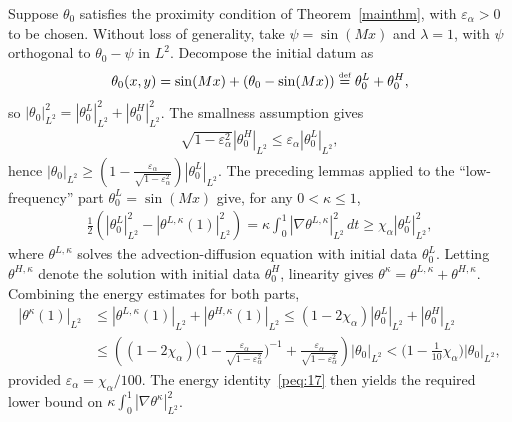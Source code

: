 \documentclass[12pt]{report}   %
\newcommand{\defeq}{\stackrel{\scriptscriptstyle\textup{def}}{=}}
\renewcommand{\le}{\leqslant}
\renewcommand{\ge}{\geqslant}
\numberwithin{equation}{section}
\theoremstyle{plain}
\theoremstyle{definition}
\theoremstyle{remark}
\begin{document}
Suppose $\theta_0$ satisfies the proximity condition of Theorem~\ref{mainthm}, with $\varepsilon_\alpha > 0$ to be chosen. Without loss of generality, take $\psi = \sin(Mx)$ and $\lambda = 1$, with $\psi$ orthogonal to $\theta_0 - \psi$ in $L^2$. Decompose the initial datum as
\begin{equation*}
\begin{split}
\theta_0(x,y) = \sin(Mx) + ( {\theta}_0 - \sin(Mx)) \defeq \theta_0^L + \theta_0^H,
\end{split}
\end{equation*}
so $|\theta_0|_{L^2}^2 = |\theta_0^L|_{L^2}^2 + |\theta_0^H|_{L^2}^2$. The smallness assumption gives
\begin{equation*}
\begin{split}
\sqrt{1-\varepsilon_\alpha^2} |\theta_0^H|_{L^2} \le \varepsilon_\alpha|\theta_0^L|_{L^2},
\end{split}
\end{equation*}
hence $|\theta_0|_{L^2} \ge (1 - \frac{\varepsilon_\alpha}{\sqrt{1-\varepsilon_\alpha^2}}) |\theta_0^L|_{L^2}$.
The preceding lemmas applied to the ``low-frequency'' part $\theta_0^L = \sin(Mx)$ give, for any $0 < \kappa \le 1$,
\begin{equation*}
\begin{split}
\frac{1}{2}( |\theta_0^L|_{L^2}^2 - |\theta^{L,\kappa}(1)|_{L^2}^2 ) = \kappa \int_0^1 |\nabla \theta^{L,\kappa}|_{L^2}^2 \,dt \ge \chi_\alpha |\theta_0^L|_{L^2}^2,
\end{split}
\end{equation*}
where $\theta^{L,\kappa}$ solves the advection-diffusion equation with initial data $\theta^L_0$. Letting $\theta^{H,\kappa}$ denote the solution with initial data $\theta^H_0$, linearity gives $\theta^\kappa = \theta^{L,\kappa} + \theta^{H,\kappa}$. Combining the energy estimates for both parts,
\begin{equation*}
\begin{split}
|\theta^\kappa(1)|_{L^2} &\le |\theta^{L,\kappa}(1)|_{L^2} + |\theta^{H,\kappa}(1)|_{L^2}
\le (1-2\chi_\alpha)|\theta^{L}_0|_{L^2} + |\theta^{H}_0|_{L^2} \\
& \le \left( (1-2\chi_\alpha)\Big(1 - \frac{\varepsilon_\alpha}{\sqrt{1-\varepsilon_\alpha^2}}\Big)^{-1} +  \frac{\varepsilon_\alpha}{\sqrt{1-\varepsilon_\alpha^2}} \right)  |\theta_0|_{L^2} <\Big( 1 - \frac{1}{10}\chi_\alpha\Big)|\theta_0|_{L^2},
\end{split}
\end{equation*}
provided $\varepsilon_\alpha = \chi_\alpha/100$. The energy identity~\eqref{peq:17} then yields the required lower bound on $\kappa\int_0^1|\nabla\theta^\kappa|_{L^2}^2$.
\hfill\qedsymbol
 
\end{document}
